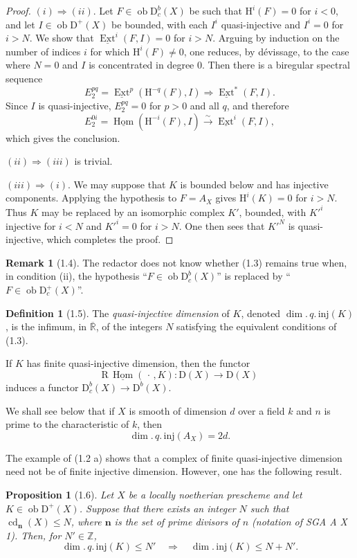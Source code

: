 \documentclass[11pt,a4paper]{article}
\newcommand{\Z}{\mathbb{Z}}
\newcommand{\D}{\mathrm{D}}
\newcommand{\ob}{\operatorname{ob}}
\DeclareMathOperator{\Hom}{Hom}
\DeclareMathOperator{\Ext}{Ext}
\DeclareMathOperator{\cd}{cd}
\newcommand{\uHom}{\underline{\Hom}}
\newcommand{\uExt}{\underline{\Ext}}
\newcommand{\RHom}{\mathrm{R}\,\underline{\Hom}}
\newcommand{\qinjdim}{\dim.\,q.\,\mathrm{inj}}
\newcommand{\injdim}{\dim.\,\mathrm{inj}}
\theoremstyle{plain}
\newtheorem*{propositionstar}{Proposition}
\theoremstyle{definition}
\newtheorem*{definitionstar}{Definition}
\newtheorem*{remarkstar}{Remark}
\begin{document}
\begin{proof}
$(i)\Rightarrow(ii)$. Let $F\in\ob\D_c^b(X)$ be such that $\mathrm H^i(F)=0$ for $i<0$, and let $I\in\ob\D^+(X)$ be bounded, with each $I^i$ quasi-injective and $I^i=0$ for $i>N$. We show that $\uExt^i(F,I)=0$ for $i>N$. Arguing by induction on the number of indices $i$ for which $\mathrm H^i(F)\ne0$, one reduces, by dévissage, to the case where $N=0$ and $I$ is concentrated in degree $0$. Then there is a biregular spectral sequence
\[
E_2^{pq}=\uExt^p(\mathrm H^{-q}(F),I)\Rightarrow \uExt^*(F,I).
\]
Since $I$ is quasi-injective, $E_2^{pq}=0$ for $p>0$ and all $q$, and therefore
\[
E_2^{0i}=\uHom(\mathrm H^{-i}(F),I)\xrightarrow{\sim}\uExt^i(F,I),
\]
which gives the conclusion.

$(ii)\Rightarrow(iii)$ is trivial.

$(iii)\Rightarrow(i)$. We may suppose that $K$ is bounded below and has injective components. Applying the hypothesis to $F=A_X$ gives $\mathrm H^i(K)=0$ for $i>N$. Thus $K$ may be replaced by an isomorphic complex $K'$, bounded, with $K'^i$ injective for $i<N$ and $K'^i=0$ for $i>N$. One then sees that $K'^N$ is quasi-injective, which completes the proof.
\end{proof}

\begin{remarkstar}[1.4]
The redactor does not know whether (1.3) remains true when, in condition (ii), the hypothesis ``$F\in\ob\D_c^b(X)$'' is replaced by ``$F\in\ob\D_c^+(X)$''.
\end{remarkstar}

\begin{definitionstar}[1.5]
The \emph{quasi-injective dimension} of $K$, denoted $\qinjdim(K)$, is the infimum, in $\overline{\mathbb R}$, of the integers $N$ satisfying the equivalent conditions of (1.3).
\end{definitionstar}

If $K$ has finite quasi-injective dimension, then the functor
\[
\RHom(\,\cdot\,,K):\D(X)\longrightarrow \D(X)
\]
induces a functor $\D_c^b(X)\to\D^b(X)$.

We shall see below that if $X$ is smooth of dimension $d$ over a field $k$ and $n$ is prime to the characteristic of $k$, then
\[
\qinjdim(A_X)=2d.
\]

The example of (1.2 a) shows that a complex of finite quasi-injective dimension need not be of finite injective dimension. However, one has the following result.

\begin{propositionstar}[1.6]
Let $X$ be a locally noetherian prescheme and let $K\in\ob\D^+(X)$. Suppose that there exists an integer $N$ such that $\cd_{\mathbf n}(X)\leq N$, where $\mathbf n$ is the set of prime divisors of $n$ (notation of SGA A X 1). Then, for $N'\in\Z$,
\[
\qinjdim(K)\leq N'\quad\Longrightarrow\quad \injdim(K)\leq N+N'.
\]
\end{propositionstar}
\end{document}
